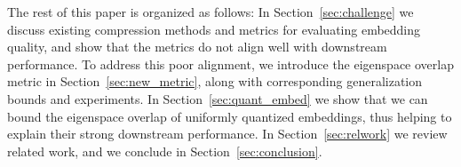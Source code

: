 The rest of this paper is organized as follows:
In Section~\ref{sec:challenge} we discuss existing compression methods and metrics for evaluating embedding quality, and show that the metrics do not align well with downstream performance.
To address this poor alignment, we introduce the eigenspace overlap metric in Section~\ref{sec:new_metric}, along with corresponding generalization bounds and experiments.
In Section~\ref{sec:quant_embed} we show that we can bound the eigenspace overlap of uniformly quantized embeddings, thus helping to explain their strong downstream performance.
In Section~\ref{sec:relwork} we review related work, and we conclude in Section~\ref{sec:conclusion}.


%
%
